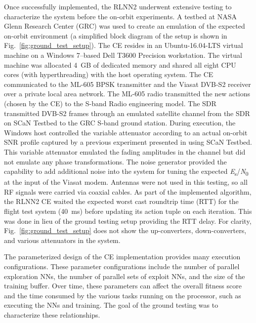 \documentclass[journal]{IEEEtran}
\begin{document}
\begin{table*}[t]
\begin{center}
\begin{tabular}{c|cccccc}
		\hline
   \end{tabular}
 \end{center}
\end{table*}
 
Once successfully implemented, the RLNN2 underwent extensive testing to characterize the system before the on-orbit experiments.  A testbed at NASA Glenn Research Center (GRC) was used to create an emulation of the expected on-orbit environment (a simplified block diagram of the setup is shown in Fig.~\ref{fig:ground_test_setup}).  The CE resides in an Ubuntu-16.04-LTS virtual machine on a Windows 7--based Dell T3600 Precision workstation.  The virtual machine was allocated 4~GB of dedicated memory and shared all eight CPU cores (with hyperthreading) with the host operating system.  The CE communicated to the ML-605 BPSK transmitter and the Viasat DVB-S2 receiver over a private local area network.  The ML-605 radio transmitted the new actions (chosen by the CE) to the S-band Radio engineering model.  The SDR transmitted DVB-S2 frames through an emulated satellite channel from the SDR on SCaN Testbed to the GRC S-band ground station.  During execution, the Windows host controlled the variable attenuator according to an actual on-orbit SNR profile captured by a previous experiment presented in \cite{downey-paper} using SCaN Testbed.  This variable attenuator emulated the fading amplitudes in the channel but did not emulate any phase transformations.  The noise generator provided the capability to add additional noise into the system for tuning the expected \textit{E}\textsubscript{s}/\textit{N}\textsubscript{0} at the input of the Viasat modem.  Antennas were not used in this testing, so all RF signals were carried via coaxial cables.  As part of the implemented algorithm, the RLNN2 CE waited the expected worst cast roundtrip time (RTT) for the flight test system (40~ms) before updating its action tuple on each iteration.  This was done in lieu of the ground testing setup providing the RTT delay.  For clarity, Fig.~\ref{fig:ground_test_setup} does not show the up-converters, down-converters, and various attenuators in the system.

The parameterized design of the CE implementation provides many execution configurations.  These parameter configurations include the number of parallel exploration NNs, the number of parallel sets of exploit NNs, and the size of the training buffer.  Over time, these parameters can affect the overall fitness score and the time consumed by the various tasks running on the processor, such as executing the NNs and training.  The goal of the ground testing was to characterize these relationships.
\end{document}
